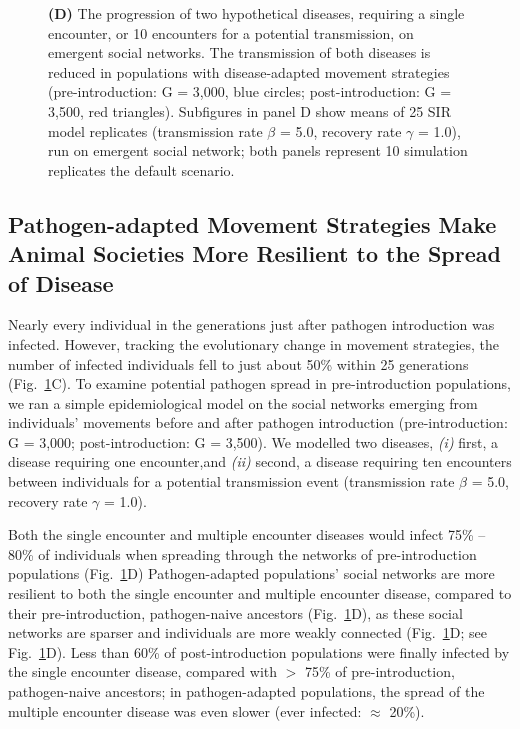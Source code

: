 \begin{figure}[!h]
{        \textbf{(D)} The progression of two hypothetical diseases, requiring a single encounter, or 10 encounters for a potential transmission, on emergent social networks. 
        The transmission of both diseases is reduced in populations with disease-adapted movement strategies (pre-introduction: G = 3,000, blue circles; post-introduction: G = 3,500, red triangles). Subfigures in panel D show means of 25 SIR model replicates (transmission rate $\beta$ = 5.0, recovery rate $\gamma$ = 1.0), run on emergent social network; both panels represent 10 simulation replicates the default scenario.
    }\label{fig_networks_disease}
\end{figure}

\subsection*{Pathogen-adapted Movement Strategies Make Animal Societies More Resilient to the Spread of Disease}

Nearly every individual in the generations just after pathogen introduction was infected.
However, tracking the evolutionary change in movement strategies, the number of infected individuals fell to just about 50\% within 25 generations (Fig.~\ref{fig_networks_disease}C).
To examine potential pathogen spread in pre-introduction populations, we ran a simple epidemiological model on the social networks emerging from individuals' movements before and after pathogen introduction (pre-introduction: G = 3,000; post-introduction: G = 3,500).
We modelled two diseases, \textit{(i)} first, a disease requiring one encounter,and \textit{(ii)} second, a disease requiring ten encounters between individuals for a potential transmission event (transmission rate $\beta$ = 5.0, recovery rate $\gamma$ = 1.0).

Both the single encounter and multiple encounter diseases would infect 75\% -- 80\% of individuals when spreading through the networks of pre-introduction populations (Fig.~\ref{fig_networks_disease}D)
Pathogen-adapted populations' social networks are more resilient to both the single encounter and multiple encounter disease, compared to their pre-introduction, pathogen-naive ancestors (Fig.~\ref{fig_networks_disease}D), as these social networks are sparser and individuals are more weakly connected (Fig.~\ref{fig_networks_disease}D; see Fig.~\ref{fig_networks_disease}D).
Less than 60\% of post-introduction populations were finally infected by the single encounter disease, compared with $>$ 75\% of pre-introduction, pathogen-naive ancestors; in pathogen-adapted populations, the spread of the multiple encounter disease was even slower (ever infected: $\approx$ 20\%).

